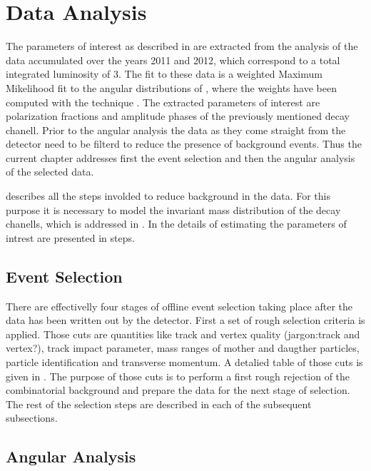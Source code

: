 
\chapter{Data Analysis}
\label{Data_Analysis}

The parameters of interest as described in  are extracted from the analysis of the
\runone \lhcb data accumulated over the years 2011 and 2012, which correspond to a total integrated luminosity
of 3\invfb. The fit to these data is a weighted Maximum Mikelihood fit to the angular distributions of \BsJpsiKst,
where the weights have been computed with the \sPlot technique \cite{splot}. The extracted parameters of interest are polarization
fractions and amplitude phases of the previously mentioned decay chanell. Prior to the angular analysis the data as 
they come straight from the detector need to be filterd to reduce the presence of background events. Thus the current
chapter addresses first the event selection and then the angular analysis of the selected data.

 describes all the steps involded to reduce background in the data. For this purpose
it is necessary to model the invariant mass distribution of the \BJpsiKpi decay chanells, which is addressed
in . In  the details of estimating the parameters
of intrest are presented in steps.


\section{Event Selection}
\label{Event_Selection}

There are effectivelly four stages of offline event selection taking place after the data has been written out by the detector. 
First a set of rough selection criteria is applied. Those cuts are quantities like track and vertex quality {\color{red}(jargon:track and vertex?)},
track impact parameter, mass ranges of mother and daugther particles, particle identification and transverse momentum. A detalied 
table of those cuts is given in . The purpose of those cuts is to perform a first rough rejection of the combinatorial background
and prepare the data for the next stage of selection. The rest of the selection steps are described in each of the subsequent subsections.



\section{Angular Analysis}
\label{Angular_Analysis}

